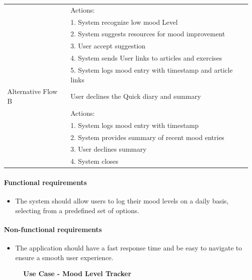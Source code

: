 \documentclass{article}
\begin{document}
\begin{table}[h!]
\begin{tabularx}{\textwidth}{|>{\raggedright\arraybackslash}p{}|X|}
                         & Actions: \\
                         & 1. System recognize low mood Level \\
                         & 2. System suggests resources for mood improvement \\
                         & 3. User accept suggestion \\
                         & 4. System sends User links to articles and exercises \\
                         & 5. System logs mood entry with timestamp and article links \\ \hline
        Alternative Flow B & User declines the Quick diary and summary  \\
                         & Actions: \\
                         & 1. System logs mood entry with timestamp \\
                         & 2. System provides summary of recent mood entries\\
                         & 3. User declines summary \\
                         & 4. System closes \\ \hline
    \end{tabularx}
\end{table}

\paragraph{Functional requirements}
		\begin{itemize}
			\item  The system should allow users to log their mood levels on a daily basis, selecting from a predefined set of options.
		\end{itemize}
		
	\paragraph{Non-functional requirements}
		\begin{itemize}
			\item The application should have a fast response time and be easy to navigate to ensure a smooth user experience.
		\end{itemize}

\clearpage

\begin{figure}[htbp]
	\textbf{Use Case - Mood Level Tracker}
	\centering
	\begin{subfigure}{\textwidth}
		\resizebox{\textwidth}{!}{}
	\end{subfigure}
	\begin{subfigure}{\textwidth}
	\end{subfigure}
\end{figure}
\end{document}
